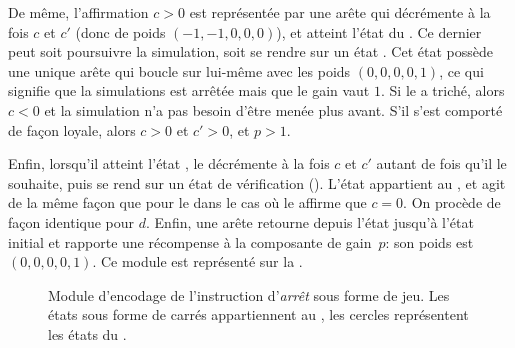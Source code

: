 De même, l'affirmation $c>0$ est représentée par une arête qui décrémente à la fois $c$ et $c'$ (donc de poids $(-1,-1,0,0,0)$), et atteint l'état du \ji.
Ce dernier peut soit poursuivre la simulation, soit se rendre sur un état \tjstopq.
Cet état possède une unique arête qui boucle sur lui-même avec les poids $(0,0,0,0,1)$, ce qui signifie que la simulations est arrêtée mais que le gain vaut $1$.
Si le \jo a triché, alors $c<0$ et la simulation n'a pas besoin d'être menée plus avant.
S'il s'est comporté de façon loyale, alors $c>0$ et $c'>0$, et $p>1$.

Enfin, lorsqu'il atteint l'état \tjhalt, le \jo décrémente à la fois $c$ et $c'$ autant de fois qu'il le souhaite, puis se rend sur un état de vérification (\tjcheck).
L'état \tjcheck appartient au \ji, et agit de la même façon que pour le \tjztest dans le cas où le \jo affirme que $c=0$.
On procède de façon identique pour $d$.
Enfin, une arête retourne depuis l'état \tjcheck jusqu'à l'état initial et rapporte une récompense à la composante de gain~$p$: son poids est $(0,0,0,0,1)$.
Ce module est représenté sur la .

\begin{figure}[ht]
\centering
{}
\caption[Module d'encodage de l'instruction d'\textit{arrêt} sous forme de jeu.]{Module d'encodage de l'instruction d'\textit{arrêt} sous forme de jeu. Les états sous forme de carrés appartiennent au \jo, les cercles représentent les états du \ji.}%
\label{tj:fig:halt}
\end{figure}

